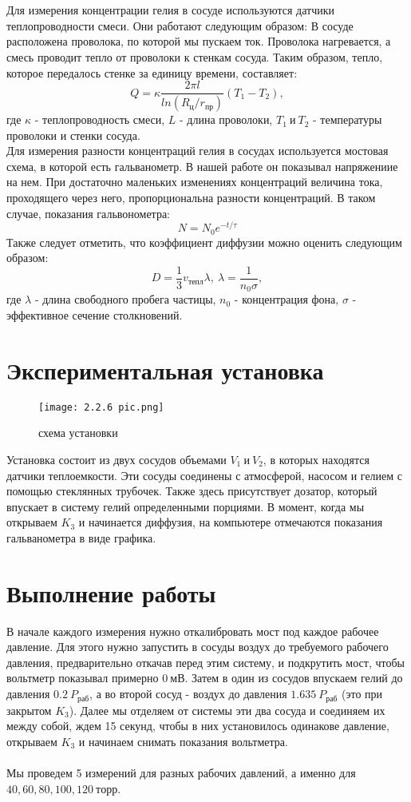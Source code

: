 \documentclass[a4paper, 12pt]{article}
\begin{document}
\\
\\
Для измерения концентрации гелия в сосуде используются датчики теплопроводности смеси. Они работают следующим образом: В сосуде расположена проволока, по которой мы пускаем ток. Проволока нагревается, а смесь проводит тепло от проволоки к стенкам сосуда. Таким образом, тепло, которое передалось стенке за единицу времени, составляет:
\[Q = \kappa \frac{2\pi l}{ln(R_ц/r_{пр})}(T_1 - T_2),\]
где \(\kappa\) - теплопроводность смеси, \(L\) - длина проволоки, \(T_1 \ и \ T_2\) - температуры проволоки и стенки сосуда.
\\
Для измерения разности концентраций гелия в сосудах используется мостовая схема, в которой есть гальванометр. В нашей работе он показывал напряжениие на нем. При достаточно маленьких изменениях концентраций величина тока, проходящего через него, пропорциональна разности концентраций. В таком случае, показания гальвонометра:
\[N = N_0e^{-t/\tau}\]
Также следует отметить, что коэффициент диффузии можно оценить следующим образом:
\[D = \frac{1}{3}v_{тепл}\lambda, \  \lambda = \frac{1}{n_0\sigma},\]
где \(\lambda\) - длина свободного пробега частицы, \(n_0\) - концентрация фона, \(\sigma\) - эффективное сечение столкновений.
\newpage
\section{Экспериментальная установка}
\begin{figure}[h]
    \centering
    \texttt{[image: 2.2.6 pic.png]}
    \caption{схема установки}
\end{figure}
Установка состоит из двух сосудов объемами \(V_1 \ и \  V_2\), в которых находятся датчики теплоемкости. Эти сосуды соединены с атмосферой, насосом и гелием с помощью стеклянных трубочек. Также здесь присутствует дозатор, который впускает в систему гелий определенными порциями. В момент, когда мы открываем \(K_3\) и начинается диффузия, на компьютере отмечаются показания гальванометра в виде графика.
\newpage
\section{Выполнение работы}
В начале каждого измерения нужно откалибровать мост под каждое рабочее давление. Для этого нужно запустить в сосуды воздух до требуемого рабочего давления, предварительно откачав перед этим систему, и подкрутить мост, чтобы вольтметр показывал примерно \(0 \ мВ\). Затем в один из сосудов впускаем гелий до давления \(0.2 \ P_{раб}\), а во второй сосуд -  воздух до давления \(1.635 \ P_{раб}\) (это при закрытом \(K_3\)). Далее мы отделяем от системы эти два сосуда и соединяем их между собой, ждем 15 секунд, чтобы в них установилось одинакове давление, открываем \(K_3\) и начинаем снимать показания вольтметра. \\
\\
Мы проведем 5 измерений для разных рабочих давлений, а именно для \(40, 60, 80, 100, 120 \ торр\). 
\end{document}

